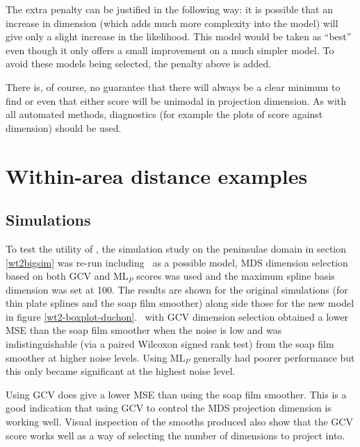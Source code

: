 The extra penalty can be justified in the following way: it is possible that an increase in dimension (which adds much more complexity into the model) will give only a slight increase in the likelihood. This model would be taken as ``best'' even though it only offers a small improvement on a much simpler model. To avoid these models being selected, the penalty above is added.

There is, of course, no guarantee that there will always be a clear minimum to find or even that either score will be unimodal in projection dimension. As with all automated methods, diagnostics (for example the plots of score against dimension) should be used.

\section{Within-area distance examples}
\label{gds-wad-examples}
\subsection{Simulations}

To test the utility of \mdsds, the simulation study on the peninsulae domain in section \ref{wt2bigsim} was re-run including \mdsds\ as a possible model, MDS dimension selection based on both GCV and $\text{ML}_P$ scores was used and the maximum spline basis dimension was set at 100. The results are shown for the original simulations (for thin plate splines and the soap film smoother) along side those for the new model in figure \ref{wt2-boxplot-duchon}. \mdsds\ with GCV dimension selection obtained a lower MSE than the soap film smoother when the noise is low and was indistinguishable (via a paired Wilcoxon signed rank test) from the soap film smoother at higher noise levels. Using $\text{ML}_P$ generally had poorer performance but this only became significant at the highest noise level.

Using GCV does give a lower MSE than using the soap film smoother. This is a good indication that using GCV to control the MDS projection dimension is working well. Visual inspection of the smooths produced also show that the GCV score works well as a way of selecting the number of dimensions to project into.

